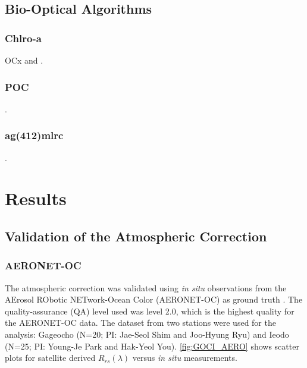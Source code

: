 \documentclass[onecolumn,3p,letterpaper,11pt]{elsarticle}
\begin{document}
\subsection{Bio-Optical Algorithms} \label{subsec:bioopalg}
\subsubsection{Chlro-a}
OCx and \citet{Hu2012}.
\subsubsection{POC}
\citet{Stramski2008}.
\subsubsection{ag(412)mlrc}
\citet{Mannino2014}.

\section{Results}
\label{sec:Results}
\subsection{Validation of the Atmospheric Correction}
\subsubsection{AERONET-OC}
The atmospheric correction was validated using {\it in situ} observations from the AErosol RObotic NETwork-Ocean Color (AERONET-OC) as ground truth \citep{Zibordi2009}. The quality-assurance (QA) level used was level 2.0, which is the highest quality for the AERONET-OC data. The dataset from two stations were used for the analysis: Gageocho (N=20; PI: Jae-Seol Shim and Joo-Hyung Ryu) and Ieodo (N=25; PI: Young-Je Park and Hak-Yeol You). \autoref{fig:GOCI_AERO} shows scatter plots for satellite derived $R_{rs}(\lambda)$ versus {\it in situ} measurements. 
\end{document}
